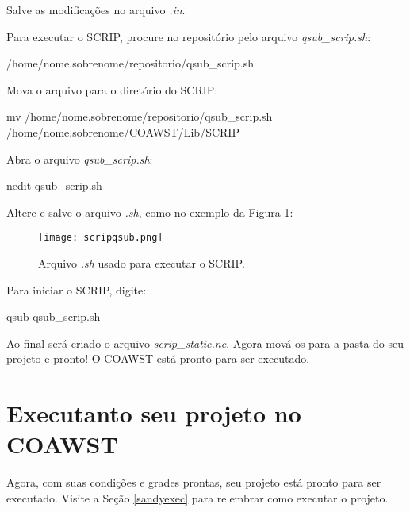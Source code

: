 \noindent Salve as modificações no arquivo \textit{.in}.
\bigskip

\noindent Para executar o SCRIP, procure no repositório pelo arquivo \textit{qsub\_scrip.sh}:
\bigskip

\begin{bashcode}
/home/nome.sobrenome/repositorio/qsub_scrip.sh
\end{bashcode}
\bigskip

\noindent Mova o arquivo para o diretório do SCRIP:
\bigskip

\begin{bashcode}[fontsize=\scriptsize]
mv /home/nome.sobrenome/repositorio/qsub_scrip.sh /home/nome.sobrenome/COAWST/Lib/SCRIP
\end{bashcode}
\bigskip

\noindent Abra o arquivo \textit{qsub\_scrip.sh}:
\bigskip

\begin{bashcode}
nedit qsub_scrip.sh
\end{bashcode}
\bigskip

\noindent Altere e salve o arquivo \textit{.sh}, como no exemplo da Figura \textcolor{bleu_cite}{\ref{qsubscripsh}}:
\bigskip

\begin{figure}[H]
    \centering
    \texttt{[image: scripqsub.png]}
    \caption{Arquivo \textit{.sh} usado para executar o SCRIP.}
    \label{qsubscripsh}
\end{figure}
\bigskip

\noindent Para iniciar o SCRIP, digite:
\bigskip

\begin{bashcode}
qsub qsub_scrip.sh
\end{bashcode}
\bigskip

\noindent Ao final será criado o arquivo \textit{scrip\_static.nc}. Agora mová-os para a pasta do seu projeto e pronto! O COAWST está pronto para ser executado.
\bigskip

\section{Executanto seu projeto no COAWST}
\bigskip

\noindent Agora, com suas condições e grades prontas, seu projeto está pronto para ser executado. Visite a Seção \textcolor{bleu_cite}{\ref{sandyexec}} para relembrar como executar o projeto.
